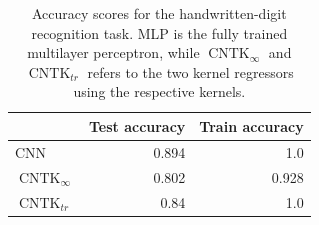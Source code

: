 \documentclass[11pt,notitlepage]{article}
\numberwithin{equation}{section}
\renewcommand{\vec}[1]{\mathbf{#1}}
\def\R{{\mathbb{R}}}
\def\Rn{{\mathbb{R}^n}}
\def\veconeton{{\{\vec{v}_1,\ \ldots\ , \vec{v}_n\}}}
\def\vi{{\vec{v}_i}}
\newcommand{\proj}[2][H^k]{{#2 \mid #1}}
\DeclareMathOperator{\CNTK}{CNTK}
\newtheorem{theorem}{Theorem}[section]
\theoremstyle{remark}
\theoremstyle{definition}
\newtheorem{definition_body}[theorem]{Definition}
\newcommand{\definition}[1]{
	\theoremstyle{definition}
	\begin{definition_body}
		#1
	\end{definition_body}
	\theoremstyle{plain}
}
\begin{document}
	\begin{table}[th!]
		\centering
		\begin{tabular}{l|r|r}
			& Test accuracy & Train accuracy\\
			\hline
			CNN & 0.894 & 1.0 \\
			$\CNTK_\infty$ & 0.802 & 0.928 \\
			$\CNTK_{tr}$ & 0.84 & 1.0
		\end{tabular}
		\caption{Accuracy scores for the handwritten-digit recognition task. MLP is the fully trained multilayer perceptron, while $\CNTK_\infty$ and $\CNTK_{tr}$ refers to the two kernel regressors using the respective kernels.}
		\label{tab:cntkScores}
	\end{table}

%	
%
\end{document}
